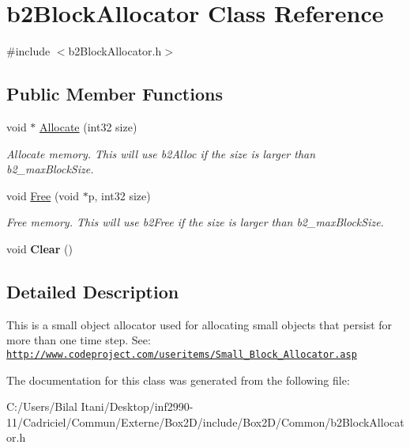 \hypertarget{classb2_block_allocator}{}\section{b2\+Block\+Allocator Class Reference}
\label{classb2_block_allocator}


{\ttfamily \#include $<$b2\+Block\+Allocator.\+h$>$}

\subsection*{Public Member Functions}
\begin{DoxyCompactItemize}
\item 
void $\ast$ \hyperlink{classb2_block_allocator_a60b4b07a234adfe19cd1279805ed6519}{Allocate} (int32 size)\hypertarget{classb2_block_allocator_a60b4b07a234adfe19cd1279805ed6519}{}\label{classb2_block_allocator_a60b4b07a234adfe19cd1279805ed6519}

\begin{DoxyCompactList}\small\item\em Allocate memory. This will use b2\+Alloc if the size is larger than b2\+\_\+max\+Block\+Size. \end{DoxyCompactList}\item 
void \hyperlink{classb2_block_allocator_a945fdf86e260318b930a53dcc887ca8b}{Free} (void $\ast$p, int32 size)\hypertarget{classb2_block_allocator_a945fdf86e260318b930a53dcc887ca8b}{}\label{classb2_block_allocator_a945fdf86e260318b930a53dcc887ca8b}

\begin{DoxyCompactList}\small\item\em Free memory. This will use b2\+Free if the size is larger than b2\+\_\+max\+Block\+Size. \end{DoxyCompactList}\item 
void {\bfseries Clear} ()\hypertarget{classb2_block_allocator_a3d3bac86217eba9d1eb6dff2acee0d77}{}\label{classb2_block_allocator_a3d3bac86217eba9d1eb6dff2acee0d77}

\end{DoxyCompactItemize}


\subsection{Detailed Description}
This is a small object allocator used for allocating small objects that persist for more than one time step. See\+: \href{http://www.codeproject.com/useritems/Small_Block_Allocator.asp}{\tt http\+://www.\+codeproject.\+com/useritems/\+Small\+\_\+\+Block\+\_\+\+Allocator.\+asp} 

The documentation for this class was generated from the following file\+:\begin{DoxyCompactItemize}
\item 
C\+:/\+Users/\+Bilal Itani/\+Desktop/inf2990-\/11/\+Cadriciel/\+Commun/\+Externe/\+Box2\+D/include/\+Box2\+D/\+Common/b2\+Block\+Allocator.\+h\end{DoxyCompactItemize}
